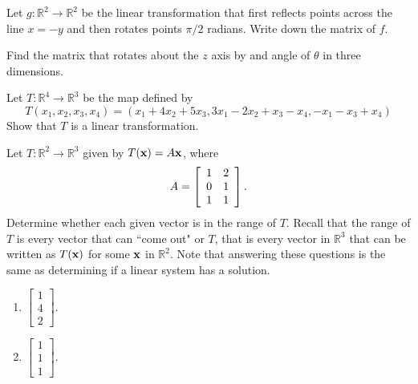 \begin{problem}
\label{2009_a7_3}
Let $g:\mathbb{R}^2\to \mathbb{R}^2$ be the linear transformation
that first reflects points across the line $x=-y$ and then rotates points $\pi/2$ radians.     Write down the matrix of $f$.
\end{problem}

\begin{problem}
\label{op3_12}
Find the matrix that rotates about the $z$ axis by and angle of $\theta$ in 
three dimensions.
\end{problem}

\begin{problem}
\label{2009_a6_5}
Let $T:\mathbb R^4\to \mathbb R^3$ be the map defined by
%
$$T(x_1,x_2,x_3,x_4)=(x_1+4x_2+5x_3,3x_1-2x_2+x_3-x_4,-x_1-x_3+x_4)$$
%
Show that $T$ is a linear transformation.
\end{problem}

\begin{problem}
\label{2009_a7_1}
Let $T:\mathbb{R}^2\to \mathbb{R}^3$ given by $T({\bf x})=A\mathbf{x}$,
where $$A=\left[\begin{array}{c c}1 & 2\\ 0 & 1\\ 1 & 1\end{array}\right].$$
Determine whether each given vector is in the range of $T$. Recall that the
range of $T$ is every vector that can ``come out" or $T$, that is every
vector in $\mathbb{R}^3$ that can be written as $T({\bf x})$ for some
$\bf x$ in $\mathbb{R}^2$. Note that answering these questions is the
same as determining if a linear system has a solution.
\begin{enumerate}
\item $\left[\begin{array}{c}1\\ 4\\ 2 \end{array}\right].$
\item $\left[\begin{array}{c}1\\ 1\\ 1 \end{array}\right].$
\end{enumerate}
\end{problem}

